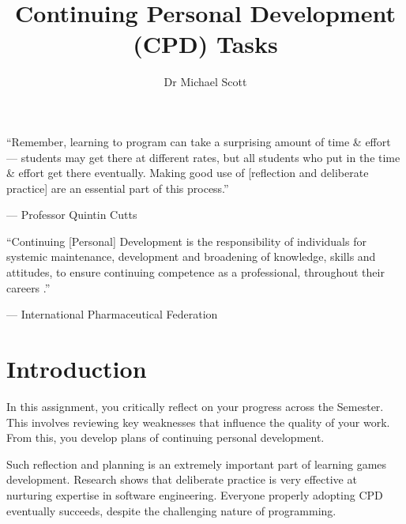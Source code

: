 \documentclass{../fal_assignment}
\title{Continuing Personal Development (CPD) Tasks}
\author{Dr Michael Scott}
\begin{document}
\maketitle
%    
\begin{marginquote}
    ``Remember, learning to program can take a surprising amount of time \& effort --- students may get there at different rates, but all students who put in the time \& effort get there eventually. Making good use of [reflection and deliberate practice] are an essential part of this process.''
    
    --- Professor Quintin Cutts

    \marginquoterule

    ``Continuing [Personal] Development is the responsibility of individuals for systemic maintenance, development and broadening of knowledge, skills and attitudes, to ensure continuing competence as a professional, throughout their careers .''
    
    --- International Pharmaceutical Federation
\end{marginquote}

\section*{Introduction}

In this assignment, you critically reflect on your progress across the Semester. This involves reviewing key weaknesses that influence the quality of your work. From this, you develop plans of continuing personal development.

Such reflection and planning is an extremely important part of learning games development. Research shows that deliberate practice is very effective at nurturing expertise in software engineering. Everyone properly adopting CPD eventually succeeds, despite the challenging nature of programming.
\end{document}
